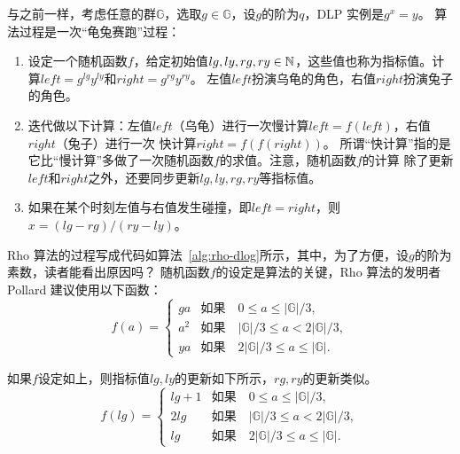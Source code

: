 与之前一样，考虑任意的群$\mathbb{G}$，选取$g \in \mathbb{G}$，设$g$的阶为$q$，DLP 实例是$g^x = y$。
算法过程是一次“龟兔赛跑”过程：
\begin{enumerate}
\item 设定一个随机函数$f$，给定初始值$lg, ly, rg, ry \in {\mathbb N}$，这些值也称为指标值。计算$left = g^{lg} y^{ly}$和$right = g^{rg} y^{ry}$。
左值$left$扮演乌龟的角色，右值$right$扮演兔子的角色。

\item 迭代做以下计算：左值$left$（乌龟）进行一次慢计算$left =f(left)$，右值$right$（兔子）进行一次
快计算$right = f(f(right))$。
所谓“快计算”指的是它比“慢计算”多做了一次随机函数$f$的求值。注意，随机函数$f$的计算
除了更新$left$和$right$之外，还要同步更新$lg, ly, rg, ry$等指标值。

\item 如果在某个时刻左值与右值发生碰撞，即$left = right$，则$x = (lg - rg) / (ry - ly)$。
\end{enumerate} 

\begin{center}
	
\end{center}

Rho 算法的过程写成代码如算法~\ref{alg:rho-dlog}所示，其中，为了方便，设$g$的阶为素数，读者能看出原因吗？
随机函数$f$的设定是算法的关键，Rho 算法的发明者 Pollard 建议使用以下函数：
\[ f(a) = \left \{
\begin{array}{ll}
ga & \text{如果}    \quad 0 \le a \leq \vert \mathbb{G} \vert /3, \\
a^2 & \text{如果} \quad \vert \mathbb{G} \vert /3 \leq a < 2\vert \mathbb{G} \vert /3,\\
ya & \text{如果}   \quad  2\vert \mathbb{G} \vert /3 \le a \le \vert \mathbb{G} \vert .
\end{array}
\right.
\]
 
如果$f$设定如上，则指标值$lg, ly$的更新如下所示，$rg, ry$的更新类似。
\[ f(lg) = \left \{
\begin{array}{ll}
lg + 1 & \text{如果} \quad 0 \le a \leq \vert \mathbb{G} \vert /3, \\
2 lg & \text{如果} \quad \vert \mathbb{G} \vert /3 \leq a < 2\vert \mathbb{G} \vert /3,\\
lg & \text{如果} \quad  2\vert \mathbb{G} \vert /3 \le a \le \vert \mathbb{G} \vert .
\end{array}
\right.
\]

